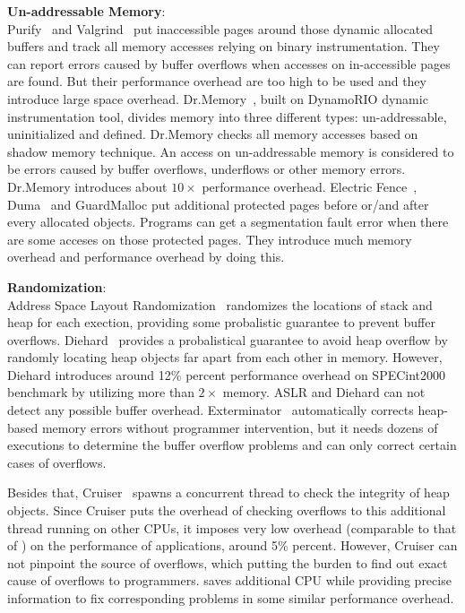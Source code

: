 \textbf{Un-addressable Memory}: \\
Purify~\cite{overflow:purify} and Valgrind~\cite{overflow:valgrind}
put inaccessible pages around those dynamic allocated buffers and 
track all memory accesses relying on binary instrumentation. 
They can report errors caused by buffer overflows when accesses on in-accessible pages are found.
But their performance overhead are too high to be used and they introduce large space overhead.
Dr.Memory~\cite{overflow:drmemory}, built on DynamoRIO dynamic instrumentation tool, divides memory
into three different types: un-addressable, uninitialized and defined. Dr.Memory checks all memory
accesses based on shadow memory technique. An access on un-addressable memory is considered
to be errors caused by buffer overflows, underflows or other memory errors. Dr.Memory introduces about $10\times$ performance overhead. 
Electric Fence~\cite{electricfence}, Duma~\cite{duma} and GuardMalloc put additional protected pages
before or/and after every allocated objects. Programs can get a segmentation fault error when there
are some acceses on those protected pages. They introduce much memory overhead and performance overhead
by doing this. 
 
\textbf{Randomization}: \\
Address Space Layout Randomization~\cite{addressobfuscation, Pax} randomizes the locations of stack and heap for each exection, providing some probalistic guarantee to prevent buffer overflows.  
Diehard~\cite{diehard} provides a probalistical guarantee to avoid heap overflow by randomly locating 
heap objects far apart from each other in memory. However, Diehard introduces around 12\% percent performance overhead on SPECint2000 benchmark by utilizing more than 
$2\times$ memory. 
ASLR and Diehard can not detect any possible buffer overhead. 
Exterminator~\cite{exterminator} automatically corrects heap-based memory errors without programmer 
intervention, but it needs dozens of executions to determine the buffer overflow 
problems and can only correct certain cases of overflows. 

Besides that, Cruiser~\cite{overflow:Cruiser} spawns a concurrent thread to check the integrity of heap objects.
Since Cruiser puts the overhead of checking overflows to this additional thread running on other CPUs,
it imposes very low overhead (comparable to that of \stopgap{}) on the performance of applications, 
around 5\% percent. However, Cruiser can not pinpoint the source of overflows, which putting the 
burden to find out exact cause of overflows to programmers. 
\stopgap{} saves additional CPU while providing precise information to fix corresponding problems
in some similar performance overhead.   

